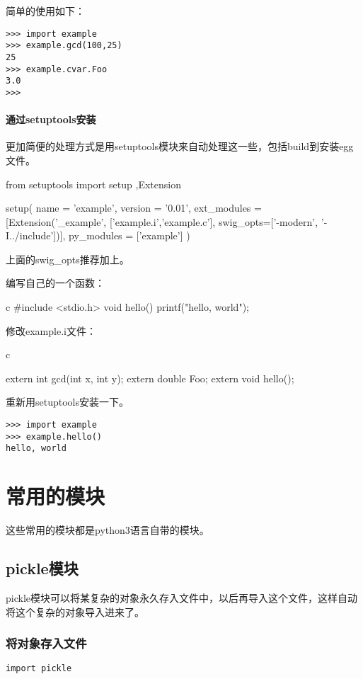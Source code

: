 \documentclass[12pt,oneside]{book}
\begin{document}
\begin{common-format}
简单的使用如下：
\begin{Verbatim}
>>> import example
>>> example.gcd(100,25)
25
>>> example.cvar.Foo
3.0
>>> 
\end{Verbatim}

\subsection{通过setuptools安装}
更加简便的处理方式是用setuptools模块来自动处理这一些，包括build到安装egg文件。
\begin{tcbpython}[]
from setuptools import setup ,Extension

setup(
    name = 'example',
    version = '0.01',
    ext_modules = [Extension('_example', ['example.i','example.c'],
    swig_opts=['-modern', '-I../include'])],
    py_modules = ['example']
)
\end{tcbpython}
上面的swig\_{}opts推荐加上。

编写自己的一个函数：
\begin{tcbcode}{c}
#include <stdio.h>
void hello(){
    printf("hello, world\n");
}
\end{tcbcode}

修改example.i文件：
\begin{tcbcode}{c}

extern int    gcd(int x, int y);
extern double Foo;
extern void hello();
\end{tcbcode}

重新用setuptools安装一下。
\begin{Verbatim}
>>> import example
>>> example.hello()
hello, world
\end{Verbatim}





\part{常用的模块}
这些常用的模块都是python3语言自带的模块。

\chapter{pickle模块}
\label{sec:pickle模块}
pickle模块可以将某复杂的对象永久存入文件中，以后再导入这个文件，这样自动将这个复杂的对象导入进来了。

\section{将对象存入文件}
\begin{Verbatim}
import pickle


\end{Verbatim}
\end{common-format}
\end{document}
